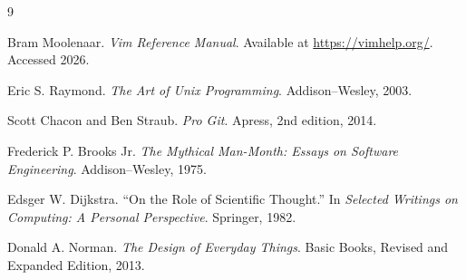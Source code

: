 \documentclass[12pt]{article}
\begin{document}
\newpage
\begin{thebibliography}{9}

Bram Moolenaar.
\emph{Vim Reference Manual}.
Available at \url{https://vimhelp.org/}. Accessed 2026.

Eric S. Raymond.
\emph{The Art of Unix Programming}.
Addison–Wesley, 2003.

Scott Chacon and Ben Straub.
\emph{Pro Git}.
Apress, 2nd edition, 2014.

Frederick P. Brooks Jr.
\emph{The Mythical Man-Month: Essays on Software Engineering}.
Addison–Wesley, 1975.

Edsger W. Dijkstra.
``On the Role of Scientific Thought.''
In \emph{Selected Writings on Computing: A Personal Perspective}.
Springer, 1982.

Donald A. Norman.
\emph{The Design of Everyday Things}.
Basic Books, Revised and Expanded Edition, 2013.

\end{thebibliography}
\end{document}
